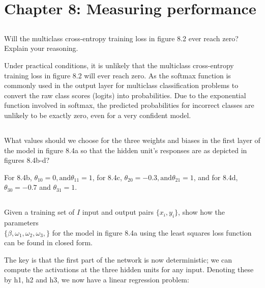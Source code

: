 \documentclass[12pt]{report}
\begin{document}
\section*{Chapter 8: Measuring performance}

\subsection{}
\begin{mdframed}
    Will the multiclass cross-entropy training loss in figure 8.2 ever reach zero? Explain your reasoning.
\end{mdframed}

Under practical conditions, it is unlikely that the multiclass cross-entropy training loss in figure 8.2 will ever reach zero. As the softmax function is commonly used in the output layer for multiclass classification problems to convert the raw class scores (logits) into probabilities. Due to the exponential function involved in softmax, the predicted probabilities for incorrect classes are unlikely to be exactly zero, even for a very confident model.

\subsection{}
\begin{mdframed}
    What values should we choose for the three weights and biases in the first layer of the model in figure 8.4a so that the hidden unit's responses are as depicted in figures 8.4b-d?
\end{mdframed}

For 8.4b, $\theta_{10} = 0, \text{and} \theta_{11} = 1$, for 8.4c, $\theta_{20} = -0.3, \text{and} \theta_{21} = 1$, and for 8.4d, $\theta_{30} = -0.7$ and $\theta_{31} = 1$.

\subsection{}
\begin{mdframed}
    Given a training set of $I$ input and output pairs $\{x_{i}, y_{i}\}$, show how the parameters \\$\{\beta, \omega_{1},\omega_{2},\omega_{3},\}$ for the model in figure 8.4a using the least squares loss function can be found in closed form.
\end{mdframed}

The key is that the first part of the network is now deterministic; we can compute the activations at the three hidden units for any input. Denoting these by h1, h2 and h3, we now have a linear regression problem:
\end{document}
